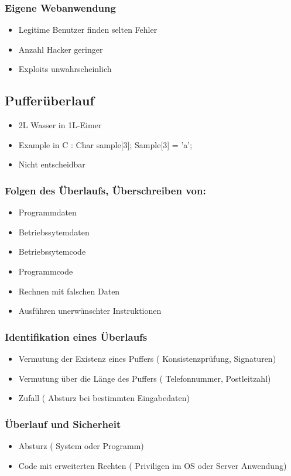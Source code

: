 \subsubsection*{Eigene Webanwendung}
\begin{itemize}
	\item Legitime Benutzer finden selten Fehler
	\item Anzahl Hacker geringer
	\item Exploits unwahrscheinlich
\end{itemize}


\subsection*{ Pufferüberlauf}
\begin{itemize}
	\item 2L Wasser in 1L-Eimer
	\item Example in C : 	Char sample[3]; Sample[3] = 'a';
	\item Nicht entscheidbar
\end{itemize}
\subsubsection*{Folgen des Überlaufs, Überschreiben von:}
\begin{itemize}
	\item Programmdaten
	\item Betriebssytemdaten
	\item Betriebssytemcode
	\item Programmcode
	\item Rechnen mit falschen Daten
	\item Ausführen unerwünschter Instruktionen
\end{itemize}

\subsubsection*{Identifikation eines Überlaufs}
\begin{itemize}
	\item Vermutung der Existenz eines Puffers ( Konsistenzprüfung, Signaturen)
	\item Vermutung über die Länge des Puffers ( Telefonnummer, Postleitzahl)
	\item Zufall ( Absturz bei bestimmten Eingabedaten)
\end{itemize}

\subsubsection*{Überlauf und Sicherheit }
\begin{itemize}
	\item Absturz ( System oder Programm)
	\item Code mit erweiterten Rechten ( Priviligen im OS oder Server Anwendung)
\end{itemize}

